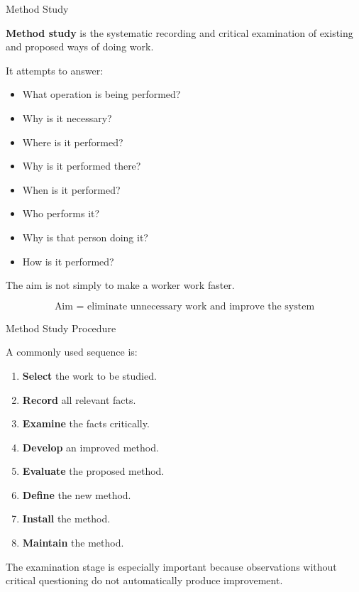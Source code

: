 \documentclass[aspectratio=169,10pt]{beamer}
\begin{document}
\begin{frame}[shrink=18]{Method Study}
\small

\textbf{Method study} is the systematic recording and critical examination
of existing and proposed ways of doing work.

\vspace{5pt}

It attempts to answer:

\begin{itemize}
    \item What operation is being performed?
    \item Why is it necessary?
    \item Where is it performed?
    \item Why is it performed there?
    \item When is it performed?
    \item Who performs it?
    \item Why is that person doing it?
    \item How is it performed?
\end{itemize}

\vspace{5pt}

The aim is not simply to make a worker work faster.

\[
\boxed{
\text{Aim = eliminate unnecessary work and improve the system}
}
\]

\end{frame}


\begin{frame}[shrink=18]{Method Study Procedure}
\small

A commonly used sequence is:

\begin{enumerate}
    \item \textbf{Select} the work to be studied.
    \item \textbf{Record} all relevant facts.
    \item \textbf{Examine} the facts critically.
    \item \textbf{Develop} an improved method.
    \item \textbf{Evaluate} the proposed method.
    \item \textbf{Define} the new method.
    \item \textbf{Install} the method.
    \item \textbf{Maintain} the method.
\end{enumerate}

\vspace{5pt}

The examination stage is especially important because observations
without critical questioning do not automatically produce improvement.

\end{frame}
\end{document}
